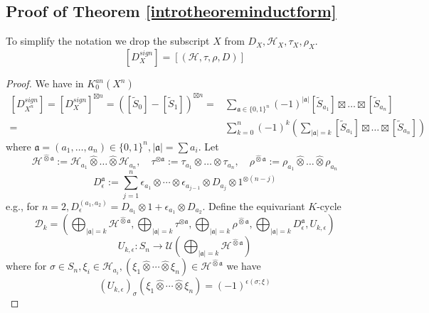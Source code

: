 \documentclass[11pt,leqno,twoside]{amsart}
\theoremstyle{plainsl}
\theoremstyle{definition}
\newcommand{\cD}{\mathcal{D}}
\newcommand{\cH}{\mathcal{H}}
\begin{document}
\subsection{Proof of Theorem \ref{introtheoreminductform}}
To simplify the notation we drop the subscript $X$ from $D_X, \cH_X,\tau_X,\rho_X$. 
  \[\left[D_X^{sign}\right]=[(\mathcal{H},
\tau,\rho,
D)]\]
\begin{proof}
 We have in $K_0^{an}(X^n)$
\begin{align}
    \left[D^{sign}_{X^n}\right]=[D^{sign}_X]^{\boxtimes n}=([\tilde{S}_0] -[\tilde{S}_1])^{\boxtimes n}=&\sum_{\mathfrak{a} \in \{0,1\}^n} (-1)^{|\mathfrak{a}|}[\tilde{S}_{a_1}]\boxtimes \ldots \boxtimes [\tilde{S}_{a_n}]\\ \label{nonequivnatequalitydx^n}
    =&\sum^n_{k=0}(-1)^k \left( \sum_{|\mathfrak{a}|=k}  [\tilde{S}_{a_1}]\boxtimes \ldots \boxtimes [\tilde{S}_{a_n}] \right)
\end{align}
where $\mathfrak{a}=(a_1,\ldots,a_n)\in \{0,1\}^n, |\mathfrak{a}|=\sum a_i$. Let
\[\cH^{\widehat{\otimes}\mathfrak{a}}:=\cH_{a_1}\widehat{\otimes} \ldots \widehat{\otimes} \cH_{a_n},\quad \tau^{{\otimes}\mathfrak{a}}:=\tau_{a_1}\otimes\ldots\otimes \tau_{a_n}, \quad \rho^{\widehat{\otimes}\mathfrak{a}}:=\rho_{a_1}\widehat{\otimes} \ldots \widehat{\otimes} \rho_{a_n}\]
\begin{equation}\label{D^a_eps}
D_\epsilon^{\mathfrak a}:=
\sum_{j=1}^n
\epsilon_{a_1}\otimes\cdots\otimes\epsilon_{a_{j-1}}
\otimes D_{a_j}\otimes
1^{\otimes(n-j)}
\end{equation}
 e.g., for $n=2, D_{\epsilon}^{(a_1,a_2)}=D_{a_1}\otimes1+\epsilon_{a_1} \otimes D_{a_2} $. Define the equivariant $K$-cycle
\begin{equation}\label{defD_k}
    \cD_k=(\bigoplus_{{|\mathfrak{a}|=k}} \cH^{\widehat{\otimes}\mathfrak{a}},\bigoplus_{{|\mathfrak{a}|=k}} \tau^{{\otimes}\mathfrak{a}},\bigoplus_{{|\mathfrak{a}|=k}} \rho^{\widehat{\otimes}\mathfrak{a}},\bigoplus_{{|\mathfrak{a}|=k}}D_{\epsilon}^{\mathfrak{a}}, U_{k,\epsilon})
\end{equation}
\[U_{k,\epsilon}:S_n\rightarrow \mathcal{U}(\bigoplus_{{|\mathfrak{a}|=k}} \cH^{\widehat{\otimes}\mathfrak{a}})\]
where for $\sigma\in S_n,\xi_i\in \cH_{a_i}, (\xi_1\widehat{\otimes}\cdots
    \widehat{\otimes}\xi_n)\in \cH^{\widehat{\otimes}\mathfrak{a}}$ we have
    \begin{equation}\label{equivaction}
        (U_{k,\epsilon})_{\sigma}(\xi_1\widehat{\otimes}\cdots
    \widehat{\otimes}\xi_n)=(-1)^{\epsilon(\sigma;\xi)}

\end{equation}
\end{proof}
\end{document}
